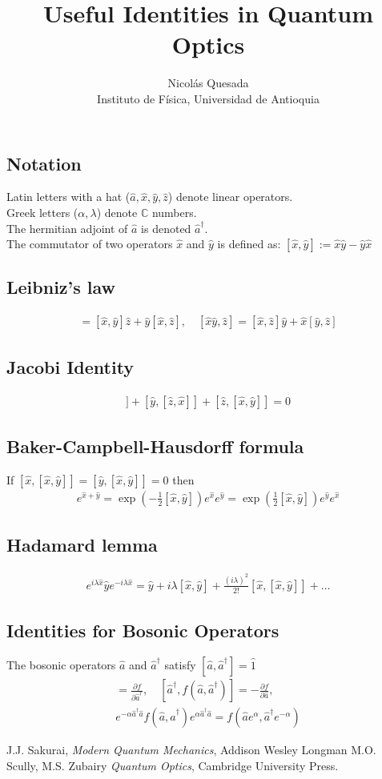 \documentclass[english,11pt]{shreyasnotes}
\date{}
\title{Useful Identities in Quantum Optics}
\author{Nicol\'as Quesada\\{\small \sf Instituto de F\'isica, Universidad de Antioquia}}
\newcommand{\eq}[1]{\begin{align*}#1\end{align*}}
\begin{document}
\maketitle
\thispagestyle{empty}

\subsection*{Notation}
Latin letters with a hat ($\hat a, \hat x, \hat y, \hat z$) denote linear operators.\\
Greek letters ($\alpha, \lambda$) denote $\mathbb{C}$ numbers.\\
The hermitian adjoint of $\hat a$ is denoted $\hat a^{\dagger}$.\\
The commutator of two operators $\hat x$ and $\hat y$ is defined as:
$ [\hat x,\hat y] := \hat x \hat y-\hat y \hat x$ \\

\subsection*{Leibniz's law }

\eq{ [\hat x, \hat y \hat z]=[\hat x, \hat y] \hat z+\hat y[\hat x,\hat z], \quad 
 [\hat x \hat y, \hat z]=[\hat x, \hat z] \hat y+\hat x[\hat y,\hat z] 
}

\subsection*{Jacobi Identity}
\eq{
 [\hat x, [ \hat y, \hat z]]+[ \hat y,[ \hat z,\hat x]]+[\hat z, [\hat x, \hat y]]=0 
}
\subsection*{Baker-Campbell-Hausdorff formula}
If $[\hat x,[\hat x,\hat y]]=[\hat y,[\hat x,\hat y]]=0$ then
\eq{e^{\hat x+\hat y}=\exp{\left(-\frac{1}{2} [\hat x,\hat y] \right)} e^{\hat x} e^{\hat y}=\exp{\left(\frac{1}{2} [\hat x,\hat y] \right)} e^{\hat y} e^{\hat x} }

\subsection*{Hadamard lemma}
\eq{ e^{ i \lambda \hat x} \hat y e^{- i \lambda \hat x}=\hat y + i \lambda [\hat x,\hat y]+\frac{(i \lambda)^2}{2!}[\hat x,[\hat x,\hat y]]+\ldots}

\subsection*{Identities for Bosonic Operators}
The bosonic operators $\hat a$ and $\hat a^\dagger$ satisfy $[\hat a,\hat a^\dagger]=\hat 1$
\eq{[\hat a,f(\hat a,\hat a^\dagger)]=\frac{\partial f}{\partial \hat a^\dagger}, \quad 
 [\hat a^\dagger,f(\hat a,\hat a^\dagger)]=-\frac{\partial f}{\partial \hat a},\\
e^{-\alpha \hat a^\dagger \hat a} f(\hat a,\hat a^\dagger) e^{\alpha \hat a^\dagger \hat a}=f(\hat a e^\alpha,\hat a^\dagger e^{-\alpha})
}

\begin{thebibliography}{}
\bibitem{} J.J. Sakurai, \textit{Modern Quantum Mechanics}, Addison Wesley Longman
\bibitem{} M.O. Scully, M.S. Zubairy \textit{Quantum Optics}, Cambridge University Press.
\end{thebibliography}
\end{document}
